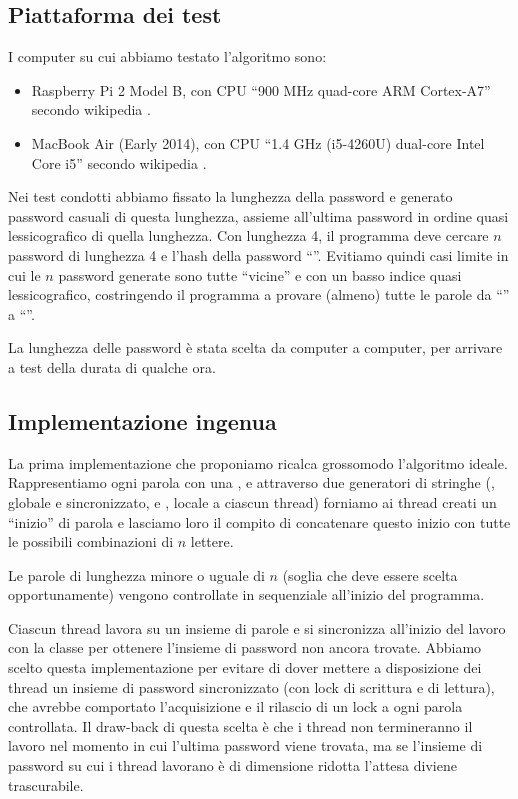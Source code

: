 \documentclass[]{myarticle}
\begin{document}
\subsection{Piattaforma dei test}

I computer su cui abbiamo testato l'algoritmo sono:
\begin{itemize}
	\item Raspberry Pi 2 Model B, con CPU ``900 MHz quad-core ARM Cortex-A7'' secondo wikipedia \cite{wikipi}.
	\item MacBook Air (Early 2014), con CPU ``1.4 GHz (i5-4260U) dual-core Intel Core i5'' secondo wikipedia \cite{wikiair}.
\end{itemize}

Nei test condotti abbiamo fissato la lunghezza della password e generato password casuali di questa lunghezza, assieme all'ultima password in ordine quasi lessicografico di quella lunghezza.
Con lunghezza 4, il programma deve cercare $n$ password di lunghezza 4 e l'hash della password ``''.
Evitiamo quindi casi limite in cui le $n$ password generate sono tutte ``vicine'' e con un basso indice quasi lessicografico, costringendo il programma a provare (almeno) tutte le parole da ``'' a ``''.

La lunghezza delle password \`e stata scelta da computer a computer, per arrivare a test della durata di qualche ora.

\subsection{Implementazione ingenua}

La prima implementazione che proponiamo ricalca grossomodo l'algoritmo ideale.
Rappresentiamo ogni parola con una , e attraverso due generatori di stringhe (, globale e sincronizzato, e , locale a ciascun thread) forniamo ai thread creati un ``inizio'' di parola e lasciamo loro il compito di concatenare questo inizio con tutte le possibili combinazioni di $n$ lettere.

Le parole di lunghezza minore o uguale di $n$ (soglia che deve essere scelta opportunamente) vengono controllate in sequenziale all'inizio del programma.

Ciascun thread lavora su un insieme di parole e si sincronizza all'inizio del lavoro con la classe  per ottenere l'insieme di password non ancora trovate.
Abbiamo scelto questa implementazione per evitare di dover mettere a disposizione dei thread un insieme di password sincronizzato (con lock di scrittura e di lettura), che avrebbe comportato l'acquisizione e il rilascio di un lock a ogni parola controllata.
Il draw-back di questa scelta \`e che i thread non termineranno il lavoro nel momento in cui l'ultima password viene trovata, ma se l'insieme di password su cui i thread lavorano \`e di dimensione ridotta l'attesa diviene trascurabile.
\end{document}
